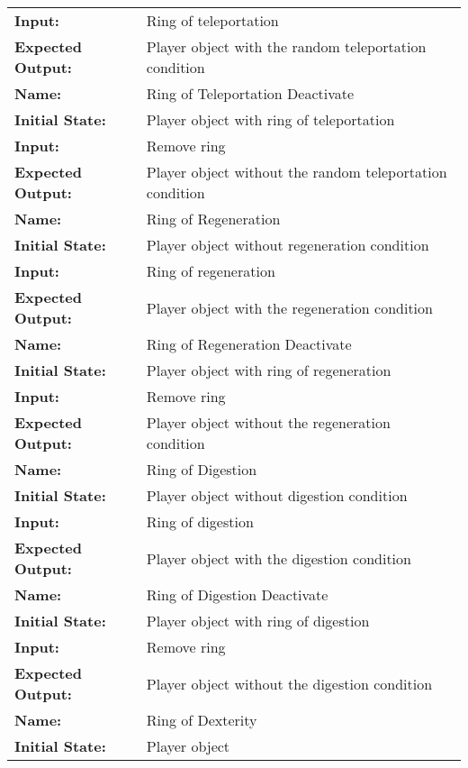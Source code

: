 \documentclass[12pt, titlepage]{article}
\begin{document}
\begin{center}
\begin{longtable}{ l | p{10cm} }
				\textbf{Input:} & Ring of teleportation\\
				\textbf{Expected Output:} & Player object with the random teleportation condition\\[0.6em]
				\hline
				\rule{0pt}{1.5em}\textbf{Name:} & Ring of Teleportation Deactivate\\
				\textbf{Initial State:} & Player object with ring of teleportation\\
				\textbf{Input:} & Remove ring\\
				\textbf{Expected Output:} & Player object without the random teleportation condition\\[0.6em]
				\hline
				\rule{0pt}{1.5em}\textbf{Name:} & Ring of Regeneration\\
				\textbf{Initial State:} & Player object without regeneration condition\\
				\textbf{Input:} & Ring of regeneration\\
				\textbf{Expected Output:} & Player object with the regeneration condition\\[0.6em]
				\hline
				\rule{0pt}{1.5em}\textbf{Name:} & Ring of Regeneration Deactivate\\
				\textbf{Initial State:} & Player object with ring of regeneration\\
				\textbf{Input:} & Remove ring\\
				\textbf{Expected Output:} & Player object without the regeneration condition\\[0.6em]
				\hline
				\rule{0pt}{1.5em}\textbf{Name:} & Ring of Digestion\\
				\textbf{Initial State:} & Player object without digestion condition\\
				\textbf{Input:} & Ring of digestion\\
				\textbf{Expected Output:} & Player object with the digestion condition\\[0.6em]
				\hline
				\rule{0pt}{1.5em}\textbf{Name:} & Ring of Digestion Deactivate\\
				\textbf{Initial State:} & Player object with ring of digestion\\
				\textbf{Input:} & Remove ring\\
				\textbf{Expected Output:} & Player object without the digestion condition\\[0.6em]
				\hline
				\rule{0pt}{1.5em}\textbf{Name:} & Ring of Dexterity\\
				\textbf{Initial State:} & Player object\\

\end{longtable}
\end{center}
\end{document}

